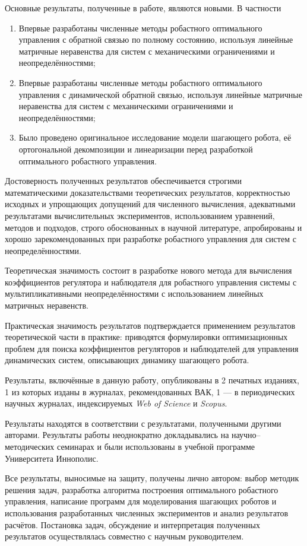 Основные результаты, полученные в работе, являются новыми. В частности
\begin{enumerate}[beginpenalty=10000] %
	\item Впервые разработаны численные методы робастного оптимального управления с обратной связью по полному состоянию, используя линейные матричные неравенства для систем с механическими ограничениями и неопределённостями;
	\item Впервые разработаны численные методы робастного оптимального управления с динамической обратной связью, используя линейные матричные неравенства для систем с механическими ограничениями и неопределённостями;
	\item Было проведено оригинальное исследование модели шагающего робота, её ортогональной декомпозиции и линеаризации перед разработкой оптимального робастного управления.
\end{enumerate}

{\probation}

Достоверность полученных результатов обеспечивается строгими математическими доказательствами теоретических результатов, корректностью исходных и упрощающих допущений для численного вычисления, адекватными результатами вычислительных экспериментов, использованием уравнений, методов и подходов, строго обоснованных в научной литературе, апробированы и хорошо зарекомендованных при разработке робастного управления для систем с неопределённостями. 

{\influence} 

Теоретическая значимость состоит в разработке нового метода для вычисления коэффициентов регулятора и наблюдателя для робастного управления системы с мультипликативными неопределённостями с использованием линейных матричных неравенств.

Практическая значимость результатов подтверждается применением результатов теоретической части в практике: приводятся формулировки оптимизационных проблем для поиска коэффициентов регуляторов и наблюдателей для управления динамических систем, описывающих динамику шагающего робота. 

{\reliability} 
Результаты, включённые в данную работу, опубликованы в 2 печатных изданиях, 1 из которых изданы в журналах, рекомендованных ВАК, 1 --- в периодических научных журналах, индексируемых \textit{Web of Science} и \textit{Scopus}. 

Результаты находятся в соответствии с результатами, полученными другими авторами. Результаты работы неоднократно докладывались на научно--методических семинарах и были использованы в учебной программе Университета Иннополис.

{\contribution} 

Все результаты, выносимые на защиту, получены лично автором: выбор методик решения задач, разработка алгоритма построения оптимального робастного управления, написание программ для моделирования шагающих роботов и использования разработанных численных экспериментов и анализ результатов расчётов. Постановка задач, обсуждение и интерпретация полученных результатов осуществлялась совместно с научным руководителем.